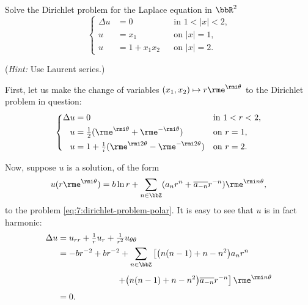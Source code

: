\begin{problem}
  Solve the Dirichlet problem for the Laplace equation in \(\bbR^2\)
  \[
    \left\{
      \begin{aligned}
        \Delta u&=0&&\text{in \(1<|x|<2\),}\\
        u&=x_1&&\text{on \(|x|=1\),}\\
        u&=1+x_1x_2&&\text{on \(|x|=2\).}
      \end{aligned}
    \right.
  \]

  \noindent (\emph{Hint:} Use Laurent series.)
\end{problem}
\begin{solution}
  First, let us make the change of variables \((x_1,x_2)\mapsto
  r\rme^{\rmi\theta}\) to the Dirichlet problem in question:
  \begin{equation}
    \label{eq:7:dirichlet-problem-polar}
    \left\{
      \begin{aligned}
        \Delta u&=0&&\text{in \(1<r<2\),}\\
        u&=\tfrac{1}{2}(\rme^{\rmi\theta}+\rme^{-\rmi\theta})&&\text{on \(r=1\),}\\
        u&=1+\tfrac{1}{i}(\rme^{\rmi 2\theta}-\rme^{-\rmi 2\theta})&&\text{on \(r=2\).}
      \end{aligned}
    \right.
  \end{equation}

  Now, suppose \(u\) is a solution, of the form
  \[
    u(r\rme^{\rmi\theta})=%
    b\ln r%
    +\sum_{n\in\bbZ} (a_nr^n+\overline{a_{-n}}r^{-n})\rme^{\rmi n\theta},
  \]
  to the problem \eqref{eq:7:dirichlet-problem-polar}. It is easy to see
  that \(u\) is in fact harmonic:
  \begin{align*}
    \Delta u%
    &=u_{rr}+\tfrac{1}{r}u_r+\tfrac{1}{r^2}u_{\theta\theta}\\
    &=-br^{-2}+br^{-2}+\sum_{n\in\bbZ}
      \left[\bigl(n(n-1)+n-n^2\bigr) a_nr^n\right.\\
    &\phantom{{}={}-\frac{b}{r^2}+\frac{b}{r^2}+}
      \left.+\bigl(n(n-1)+n-n^2\bigr)\overline{a_{-n}}r^{-n}\right]\rme^{\rmi
      n\theta}\\
    &=0.
  \end{align*}


\end{solution}
